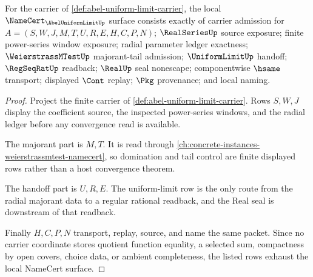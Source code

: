 \begin{theorem}
\label{thm:abel-uniform-limit-namecert-obligations}
For the carrier of \autoref{def:abel-uniform-limit-carrier}, the local $\NameCert_{\AbelUniformLimitUp}$ surface consists exactly of carrier admission for $A=(S,W,J,M,T,U,R,E,H,C,P,N)$; $\RealSeriesUp$ source exposure; finite power-series window exposure; radial parameter ledger exactness; $\WeierstrassMTestUp$ majorant-tail admission; $\UniformLimitUp$ handoff; $\RegSeqRatUp$ readback; $\RealUp$ seal nonescape; componentwise $\hsame$ transport; displayed $\Cont$ replay; $\Pkg$ provenance; and local naming.
\end{theorem}
\begin{proof}
Project the finite carrier of \autoref{def:abel-uniform-limit-carrier}. Rows $S,W,J$ display the coefficient source, the inspected power-series windows, and the radial ledger before any convergence read is available.

The majorant part is $M,T$. It is read through \autoref{ch:concrete-instances-weierstrassmtest-namecert}, so domination and tail control are finite displayed rows rather than a host convergence theorem.

The handoff part is $U,R,E$. The uniform-limit row is the only route from the radial majorant data to a regular rational readback, and the Real seal is downstream of that readback.

Finally $H,C,P,N$ transport, replay, source, and name the same packet. Since no carrier coordinate stores quotient function equality, a selected sum, compactness by open covers, choice data, or ambient completeness, the listed rows exhaust the local NameCert surface.
\end{proof}

